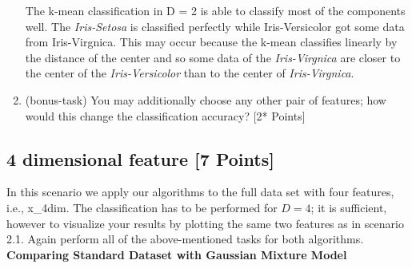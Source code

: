 \documentclass[a4paper]{article}
\begin{document}
\begin{enumerate}
The k-mean classification in D = 2 is able to classify most of the components well. The \textit{Iris-Setosa} is classified perfectly while Iris-Versicolor got some data from Iris-Virgnica. This may occur because the k-mean classifies linearly by the distance of the center and so some data of the \textit{Iris-Virgnica} are closer to the center of the \textit{Iris-Versicolor} than to the center of \textit{Iris-Virgnica}.

\item  (bonus-task) You may additionally choose any other pair of features; how would this change the classification accuracy? [2* Points]
\end{enumerate}

\newpage

\subsection{4 dimensional feature [7 Points]}
In this scenario we apply our algorithms to the full data set with four features, i.e., x\_4dim. The classification has to be performed for $D = 4$; it is sufficient, however to visualize your results by plotting the same two features as in scenario 2.1. Again perform all of the above-mentioned tasks for both algorithms. \\

\noindent
{\large \textbf{Comparing Standard Dataset with Gaussian Mixture Model}} \\

  
\end{document}
